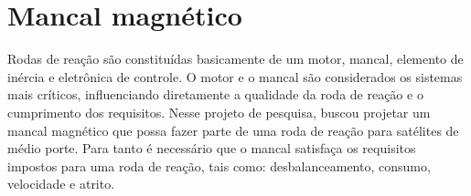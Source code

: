 \pagestyle{empty}
\cleardoublepage
\pagestyle{fancy}

\chapter{Mancal magnético}



Rodas de reação são constituídas basicamente de um motor, mancal, elemento de inércia e eletrônica de controle. O motor e o mancal são considerados os sistemas mais críticos, influenciando diretamente a qualidade da roda de reação e o cumprimento dos requisitos. Nesse projeto de pesquisa, buscou projetar um mancal magnético que possa fazer parte de uma roda de reação para satélites de médio porte. Para tanto é necessário que o mancal satisfaça os requisitos impostos para uma roda de reação, tais como: desbalanceamento, consumo, velocidade e atrito.

